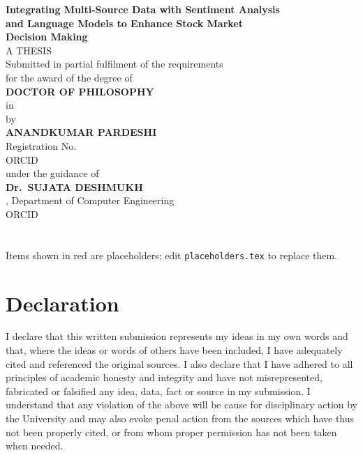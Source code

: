 \begin{titlepage}
\centering
\vspace*{0.6cm}
{\Large\bfseries Integrating Multi-Source Data with Sentiment Analysis\\[4pt]
and Language Models to Enhance Stock Market\\[4pt] Decision Making}\\[1.6cm]
{\normalsize A THESIS}\\[0.4cm]
{\normalsize Submitted in partial fulfilment of the requirements\\
for the award of the degree of}\\[0.5cm]
{\large\bfseries DOCTOR OF PHILOSOPHY}\\[0.2cm]
{\normalsize in \Discipline}\\[1.4cm]
{\normalsize by}\\[0.35cm]
{\large\bfseries ANANDKUMAR PARDESHI}\\[0.18cm]
{\normalsize Registration No.\ \RegNo}\\[0.18cm]
{\normalsize ORCID \ScholarORCID}\\[1.4cm]
{\normalsize under the guidance of}\\[0.35cm]
{\large\bfseries Dr.\ SUJATA DESHMUKH}\\[0.18cm]
{\normalsize \GuideDesignation, Department of Computer Engineering}\\[0.18cm]
{\normalsize ORCID \GuideORCID}\\[1.6cm]
{\normalsize \ResearchCentre}\\[0.25cm]
{\normalsize \Univ}\\[1.6cm]
{\normalsize \SubMonth}
\vfill
{\footnotesize\color{phcolor} Items shown in red are placeholders; edit
\texttt{placeholders.tex} to replace them.}
\end{titlepage}

\chapter*{Declaration}
\thispagestyle{plain}

I declare that this written submission represents my ideas in my own words and that,
where the ideas or words of others have been included, I have adequately cited and
referenced the original sources. I also declare that I have adhered to all principles
of academic honesty and integrity and have not misrepresented, fabricated or falsified
any idea, data, fact or source in my submission. I understand that any violation of
the above will be cause for disciplinary action by the University and may also evoke
penal action from the sources which have thus not been properly cited, or from whom
proper permission has not been taken when needed.

